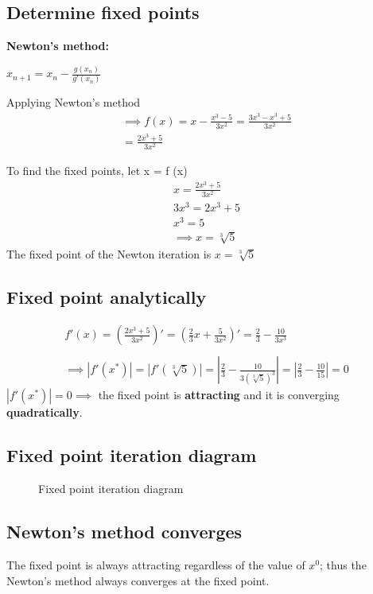 \subsection{Determine fixed points}
\label{Fixed point finding}
\textbf{Newton's method:}
\begin{centering}
    $x_{n+1} = x_{n} - \frac{g(x_{n})}{g'(x_{n})}$
\end{centering}

Applying Newton's method\\
\begin{align*}
\implies f(x) = x - \frac{x^{3} - 5}{3x^{2}} = \frac{3x^{3} - x^{3} + 5}{3x^{2}}\\
= \frac{2x^{3} + 5}{3x^{2}} 
\end{align*}

To find the fixed points, let x = f (x)\\
\begin{align*}
x = \frac{2x^{3} + 5}{3x^{2}} \\
3x^{3} = 2x^{3} + 5  \\
x^{3} = 5 \\
\implies x = \sqrt[3]{5}
\end{align*}
The fixed point of the Newton iteration is $x= \sqrt[3]{5}$ \\

\subsection{Fixed point analytically}
\begin{align*}
    f'(x) = (\frac{2x^{3} + 5}{3x^{2}})'
    = (\frac{2}{3}x + \frac{5}{3x^{2}})'
    = \frac{2}{3} - \frac{10}{3x^{3}} \\
    \\
    \implies|f'(x^{*})| = |f'(\sqrt[3]{5})| = |\frac{2}{3} - \frac{10}{3(\sqrt[3]{5})^{3}}| = |\frac{2}{3} - \frac{10}{15}| = 0
\end{align*}
$|f'(x^{*})| = 0 \implies$ the fixed point is \textbf{attracting} and it is converging \textbf{quadratically}.

\subsection{Fixed point iteration diagram}
\begin{figure}[H]
\centering
{}
\caption{Fixed point iteration diagram}
\end{figure}

\subsection{Newton's method converges}
The fixed point is always attracting regardless of the value of $x^{0}$; thus the Newton's method always converges at the fixed point.

\newpage
